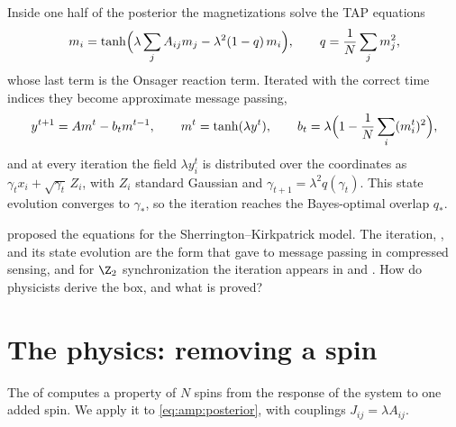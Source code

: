 \begin{refsection}
\begin{physicsbox}
Inside one half of the posterior the magnetizations solve the TAP equations
\[
m_i=\tanh\Bigl(\lambda\sum_jA_{ij}m_j-\lambda^2(1-q)\,m_i\Bigr),\qquad q=\frac1N\sum_jm_j^2,
\]
whose last term is the Onsager reaction term. Iterated with the correct time indices they become approximate message passing,
\[
y^{t+1}=Am^t-b_tm^{t-1},\qquad m^t=\tanh(\lambda y^t),\qquad b_t=\lambda\Bigl(1-\frac1N\sum_i(m_i^t)^2\Bigr),
\]
and at every iteration the field $\lambda y_i^t$ is distributed over the coordinates as $\gamma_tx_i+\sqrt{\gamma_t}\,Z_i$, with $Z_i$ standard Gaussian and $\gamma_{t+1}=\lambda^2q(\gamma_t)$. This state evolution converges to $\gamma_*$, so the iteration reaches the Bayes-optimal overlap $q_*$.
\end{physicsbox}

\Textcite{ThoulessAndersonPalmer1977} proposed the equations for the Sherrington--Kirkpatrick model. The iteration, , and its state evolution are the form that \textcite{DonohoMalekiMontanari2009} gave to message passing in compressed sensing, and for $\Z_2$ synchronization the iteration appears in \textcite{DeshpandeAbbeMontanari2016} and \textcite{MontanariVenkataramanan2021}. How do physicists derive the box, and what is proved?

\section{The physics: removing a spin}\label{sec:amp:physics}

The  of \textcite{MezardParisiVirasoro1986} computes a property of $N$ spins from the response of the system to one added spin. We apply it to \eqref{eq:amp:posterior}, with couplings $J_{ij}=\lambda A_{ij}$.


\end{refsection}
